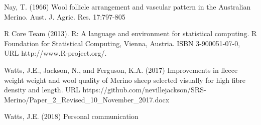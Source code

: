 \documentclass[titlepage]{article}  %
\begin{document}
\begin{thebibliography}{99}
Nay, T. (1966) Wool follicle arrangement and vascular pattern in the Australian Merino. Aust. J. Agric. Res. 17:797-805

R Core Team (2013). R: A language and environment for statistical
  computing. R Foundation for Statistical Computing, Vienna, Austria.
  ISBN 3-900051-07-0, URL http://www.R-project.org/.


Watts, J.E., Jackson, N., and Ferguson, K.A. (2017) Improvements in fleece weight weight and wool quality of Merino sheep selected visually for high fibre density and length. URL https://github.com/nevillejackson/SRS-Merino/Paper\_2\_Revised\_10\_November\_2017.docx 

Watts, J.E. (2018) Personal communication

\end{thebibliography}
\end{document}
